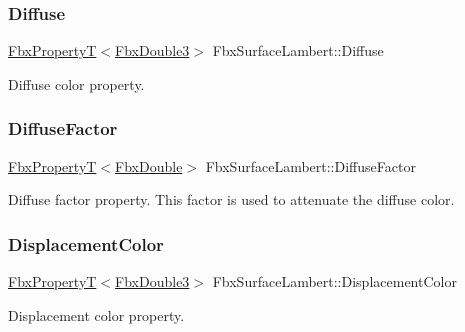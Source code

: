 \subsubsection{\texorpdfstring{Diffuse}{Diffuse}}
{\footnotesize\ttfamily \hyperlink{class_fbx_property_t}{Fbx\+PropertyT}$<$\hyperlink{fbxtypes_8h_ae0a96f14cde566774c7553aa7523b7a7}{Fbx\+Double3}$>$ Fbx\+Surface\+Lambert\+::\+Diffuse}



Diffuse color property. 

\mbox{\label{class_fbx_surface_lambert_a360be5445d5d6e4ab1fcba621853b32e}} 
\subsubsection{\texorpdfstring{Diffuse\+Factor}{DiffuseFactor}}
{\footnotesize\ttfamily \hyperlink{class_fbx_property_t}{Fbx\+PropertyT}$<$\hyperlink{fbxtypes_8h_a171e72a1c46fc15c1a6c9c31948c1c5b}{Fbx\+Double}$>$ Fbx\+Surface\+Lambert\+::\+Diffuse\+Factor}

Diffuse factor property. This factor is used to attenuate the diffuse color. \mbox{\label{class_fbx_surface_lambert_a8a3ed77989cf29c09cc0f2ba984f908b}} 
\subsubsection{\texorpdfstring{Displacement\+Color}{DisplacementColor}}
{\footnotesize\ttfamily \hyperlink{class_fbx_property_t}{Fbx\+PropertyT}$<$\hyperlink{fbxtypes_8h_ae0a96f14cde566774c7553aa7523b7a7}{Fbx\+Double3}$>$ Fbx\+Surface\+Lambert\+::\+Displacement\+Color}



Displacement color property. 

\mbox{\label{class_fbx_surface_lambert_a13018502111bc9498c11a9538f90e9d2}} 
